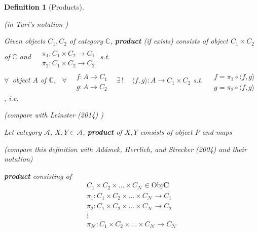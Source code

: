 \documentclass[10pt]{amsart}
\newtheorem{definition}{Definition}
\begin{document}
\begin{multicols*}{2}
\begin{definition}[Products]\label{Def:Products}
	
	(in Turi's notation \cite{Turi2001})
	
	Given objects $C_1,C_2$ of category $\mathbb{C}$, \textbf{product} (if exists) consists of object $C_1 \times C_2$ of $\mathbb{C}$ and $\begin{aligned} & \quad \\
	& \pi_1 : C_1 \times C_2 \to C_1 \\
	& \pi_2: C_1 \times C_2 \to C_2 \end{aligned}$ s.t. \\
	$\forall \, $ object $A$ of $\mathbb{C}$, \, $\forall \, \begin{aligned} & \quad \\
	& f : A \to C_1 \\
	& g : A \to C_2 \end{aligned}$ \quad \, $\exists \, ! \quad \, \langle f,g \rangle : A \to C_1 \times C_2$ s.t. $\begin{aligned} & \quad \\
	& f = \pi_1 \circ \langle f,g \rangle \\
	& g = \pi_2 \circ \langle f,g \rangle \end{aligned}$, i.e. 
	
	
	(compare with Leinster (2014) \cite{Lein2014})
	
	Let category $\mathcal{A}$, $X,Y \in \mathcal{A}$, \textbf{product} of $X,Y$ consists of object $P$ and maps
	
	(compare this definition with Ad\'{a}mek, Herrlich, and Strecker (2004) \cite{AHS2004} and their notation)
	
	\textbf{product} consisting of 
	\[
	\begin{aligned}
	C_1 \times C_2 \times \dots \times C_{\mathcal{N}} \in \text{Obj}\mathbf{C} \\
	\pi_1 : C_1 \times C_2 \times \dots \times C_{\mathcal{N}} \to C_1 \\ 
	\pi_2 : C_1 \times C_2 \times \dots \times C_{\mathcal{N}} \to C_2 \\ 
	\vdots \\
	\pi_{\mathcal{N}} : C_1 \times C_2 \times \dots \times C_{\mathcal{N}} \to C_{\mathcal{N}} \\ 
	\end{aligned}
	\]
	

\end{definition}
\end{multicols*}
\end{document}
